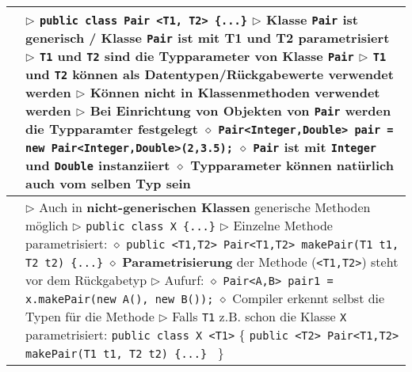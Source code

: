 \begin{longtable}{ | p{} p{} | }
	\makecell[l]{Generische Klassen} & \makecell[l]{
	$\triangleright$ \texttt{public class Pair <T1, T2> \{...\}} \\
	$\triangleright$ Klasse \texttt{Pair} ist \textbf{generisch} / Klasse \texttt{Pair} ist mit T1 und T2 \textbf{parametrisiert} \\
	$\triangleright$ \texttt{T1} und \texttt{T2} sind die \textbf{Typparameter} von Klasse \texttt{Pair} \\
	$\triangleright$ \texttt{T1} und \texttt{T2} können als Datentypen/Rückgabewerte verwendet werden \\
	$\triangleright$ Können \textbf{nicht} in Klassenmethoden verwendet werden  \\
	$\triangleright$ Bei Einrichtung von Objekten von \texttt{Pair} werden die Typparamter festgelegt \\
	\hspace{0.4cm} $\diamond$ \texttt{Pair<Integer,Double> pair = new Pair<Integer,Double>(2,3.5);} \\
	\hspace{0.4cm} $\diamond$ \texttt{Pair} ist mit \texttt{Integer} und \texttt{Double} \textbf{instanziiert}\\
	\hspace{0.4cm} $\diamond$ Typparameter können natürlich auch vom selben Typ sein} \\ \hline

	\makecell[l]{Generische Methoden} & \makecell[l]{
	$\triangleright$ Auch in \textbf{nicht-generischen Klassen} generische Methoden möglich \\
	$\triangleright$ \texttt{public class X \{...\}} \\
	$\triangleright$ Einzelne Methode parametrisiert: \\
	\hspace{0.4cm} $\diamond$ \texttt{public <T1,T2> Pair<T1,T2> makePair(T1 t1, T2 t2) \{...\}} \\
	\hspace{0.4cm} $\diamond$ \textbf{Parametrisierung} der Methode (\texttt{<T1,T2>}) steht vor dem Rückgabetyp \\
	$\triangleright$ Aufurf: \\
	\hspace{0.4cm} $\diamond$ \texttt{Pair<A,B> pair1 = x.makePair(new A(), new B());} \\
	\hspace{0.4cm} $\diamond$ Compiler erkennt selbst die Typen für die Methode \\
	$\triangleright$ Falls \texttt{T1} z.B. schon die Klasse \texttt{X} parametrisiert: \\
	\hspace{0.8cm} \texttt{public class X <T1>} \{ \\
	\hspace{1.2cm} \texttt{public <T2> Pair<T1,T2> makePair(T1 t1, T2 t2) \{...\} } \\
	\hspace{0.8cm} \} } \\ \hline 


\end{longtable}
